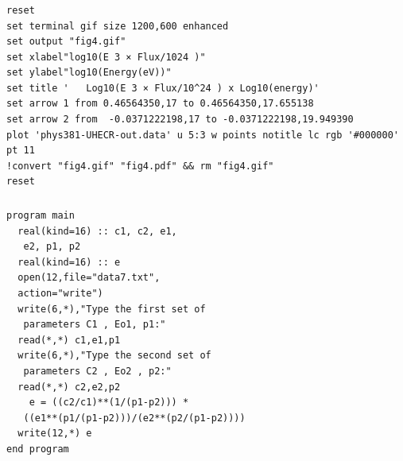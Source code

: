 \documentclass[twocolumn]{article}
\begin{document}
\subsubsection{}
\begin{verbatim}
reset
set terminal gif size 1200,600 enhanced
set output "fig4.gif"
set xlabel"log10(E 3 × Flux/1024 )"
set ylabel"log10(Energy(eV))"
set title '   Log10(E 3 × Flux/10^24 ) x Log10(energy)'
set arrow 1 from 0.46564350,17 to 0.46564350,17.655138
set arrow 2 from  -0.0371222198,17 to -0.0371222198,19.949390
plot 'phys381-UHECR-out.data' u 5:3 w points notitle lc rgb '#000000' pt 11
!convert "fig4.gif" "fig4.pdf" && rm "fig4.gif"
reset
\end{verbatim}\label{log10(E 3 × Flux/1024 ) $\times$ log10(energy)}

\subsubsection{}

\begin{verbatim}
program main
  real(kind=16) :: c1, c2, e1,
   e2, p1, p2
  real(kind=16) :: e
  open(12,file="data7.txt",
  action="write")
  write(6,*),"Type the first set of
   parameters C1 , Eo1, p1:"
  read(*,*) c1,e1,p1 
  write(6,*),"Type the second set of
   parameters C2 , Eo2 , p2:"
  read(*,*) c2,e2,p2
    e = ((c2/c1)**(1/(p1-p2))) *
   ((e1**(p1/(p1-p2)))/(e2**(p2/(p1-p2))))
  write(12,*) e
end program
\end{verbatim}\label{Fortran program for E}
\end{document}
